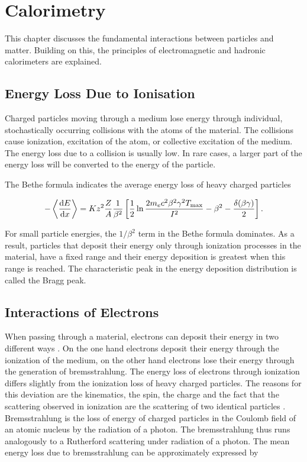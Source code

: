 \documentclass[12pt, a4paper]{thesis}
\begin{document}
\chapter{Calorimetry}
\label{sec:org802b29d}

This chapter discusses the fundamental interactions between particles and
matter.  Building on this, the principles of
electromagnetic and hadronic calorimeters are explained.

\section{Energy Loss Due to Ionisation}
\label{sec:org57bbfcf}

Charged particles moving through a medium lose energy through
individual, stochastically occurring collisions with the atoms of the
material. The collisions cause ionization, excitation of the atom, or
collective excitation of the medium.  The energy loss due to a
collision is usually low. In rare cases, a larger part of the energy
loss will be converted to the energy of the particle.

The Bethe formula indicates the average energy loss of heavy charged particles

\begin{align}
  -\expval{\dv{E}{x}} = K z^2 \frac{Z}{A} \frac{1}{\beta^{2}} \left[ \frac{1}{2} \ln{\frac{2 m_{e} c^{2} \beta^{2} \gamma^{2} T_{\text{max}}}{I^{2}}}-\beta^{2} - \frac{\delta(\beta\gamma)}{2}\right].
\end{align}

For small particle energies, the \(1/\beta^2\) term in the Bethe formula
dominates. As a result, particles that deposit their energy only
through ionization processes in the material, have a fixed range and
their energy deposition is greatest when this range is reached. The
characteristic peak in the energy deposition distribution is called
the Bragg peak.

\section{Interactions of Electrons}
\label{sec:org978e80c}

When passing through a material, electrons can deposit their energy in
two different ways \cite{kolanoski16}. On the one hand electrons
deposit their energy through the ionization of the medium, on the
other hand electrons lose their energy through the generation of
bremsstrahlung.  The energy loss of electrons through ionization
differs slightly from the ionization loss of heavy charged
particles. The reasons for this deviation are the kinematics, the
spin, the charge and the fact that the scattering observed in
ionization are the scattering of two identical particles
\cite{PhysRevD.98.030001}.  Bremsstrahlung is the loss of energy of
charged particles in the Coulomb field of an atomic nucleus by the
radiation of a photon. The bremsstrahlung thus runs analogously to a
Rutherford scattering under radiation of a photon.  The mean energy
loss due to bremsstrahlung can be approximately expressed by
\end{document}
